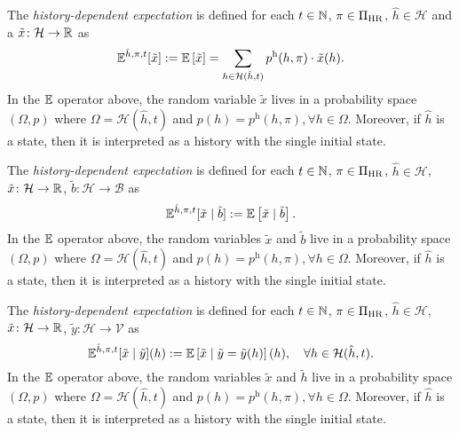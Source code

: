 \begin{definition}\label{def:expect-h}
The \emph{history-dependent expectation} is defined for each $t\in \mathbb{N}$, $\pi\in \Pi_{\mathrm{HR}}$, $\hat{h}\in \mathcal{H}$ and a $\tilde{x}\colon \mathcal{H} \to \mathbb{R}$ as
\begin{equation*}
\mathbb{E}^{\hat{h}, \pi, t} [\tilde{x}]
:= \mathbb{E} \left[ \tilde{x} \right] 
= \sum_{h \in \mathcal{H}(\hat{h}, t)} p^{\mathrm{h}}(h, \pi) \cdot \tilde{x}(h).
\end{equation*}
In the $\mathbb{E}$ operator above, the random variable $\tilde{x}$ lives in a probability space $(\Omega, p)$ where $\Omega = \mathcal{H}(\hat{h}, t)$ and $p(h) = p^{\mathrm{h}}(h, \pi), \forall h\in \Omega$.
Moreover, if $\hat{h}$ is a state, then it is interpreted as a history with the single initial state.
 \leanok
\end{definition}


\begin{definition}\label{def:expect-h-cnd}
The \emph{history-dependent expectation} is defined for each $t\in \mathbb{N}$, $\pi\in \Pi_{\mathrm{HR}}$, $\hat{h}\in \mathcal{H}$, $\tilde{x}\colon \mathcal{H} \to \mathbb{R}$, $\tilde{b}\colon \mathcal{H} \to \mathcal{\mathcal{B}}$ as
\begin{equation*}
\mathbb{E}^{\hat{h}, \pi, t} [\tilde{x} \mid \tilde{b} ]
:= \mathbb{E} \left[ \tilde{x} \mid  \tilde{b} \right].
\end{equation*}
In the $\mathbb{E}$ operator above, the random variables $\tilde{x}$ and $\tilde{b}$ live in a probability space $(\Omega, p)$ where $\Omega = \mathcal{H}(\hat{h}, t)$ and $p(h) = p^{\mathrm{h}}(h, \pi), \forall h\in \Omega$.
Moreover, if $\hat{h}$ is a state, then it is interpreted as a history with the single initial state.
 \leanok
\end{definition}

\begin{definition}\label{def:expect-h-cnd-rv}
The \emph{history-dependent expectation} is defined for each $t\in \mathbb{N}$, $\pi\in \Pi_{\mathrm{HR}}$, $\hat{h}\in \mathcal{H}$, $\tilde{x}\colon \mathcal{H} \to \mathbb{R}$, $\tilde{y}\colon \mathcal{H} \to \mathcal{\mathcal{V}}$ as
\begin{equation*}
\mathbb{E}^{\hat{h}, \pi, t} [\tilde{x} \mid \tilde{y} ](h)
:= \mathbb{E} \left[ \tilde{x} \mid \tilde{y} = \tilde{y}(h) \right](h), \quad\forall h\in \mathcal{H}(\hat{h}, t).
\end{equation*}
In the $\mathbb{E}$ operator above, the random variables $\tilde{x}$ and $\tilde{h}$ live in a probability space $(\Omega, p)$ where $\Omega = \mathcal{H}(\hat{h}, t)$ and $p(h) = p^{\mathrm{h}}(h, \pi), \forall h\in \Omega$.
Moreover, if $\hat{h}$ is a state, then it is interpreted as a history with the single initial state.
 \leanok
\end{definition}


